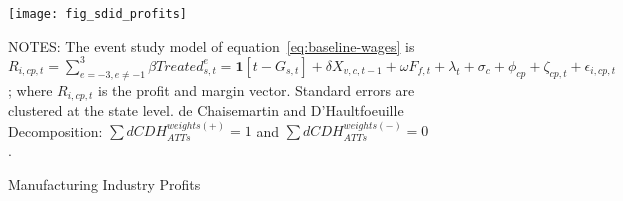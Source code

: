 \begin{figure}[H]
    \centering
    \texttt{[image: fig\_sdid\_profits]}
    \caption{Manufacturing Industry Profits}
    \label{fig:baseline-manufacturing-industry-profits}
    \begin{minipage}{\columnwidth}
        \vspace{0.05in}
        \tiny NOTES: The event study model of equation~\ref{eq:baseline-wages} is $R_{i,cp,t} = \sum_{{e = -3},{e \neq -1}}^{3} \beta Treated_{s,t}^e = \textbf{1}[t - G_{s,t}] + \delta X_{v,c,t-1} + \omega F_{f,t} + \lambda_{t} + \sigma_{c} + \phi_{cp} + \zeta_{cp,t} + \epsilon_{i,cp,t}$; where $R_{i,cp,t}$ is the profit and margin vector. Standard errors are clustered at the state level. de Chaisemartin and D'Haultfoeuille Decomposition: $\sum dCDH_{ATTs}^{weights(+)} = 1$ and $\sum dCDH_{ATTs}^{weights(-)} = 0$.
    \end{minipage}
\end{figure}